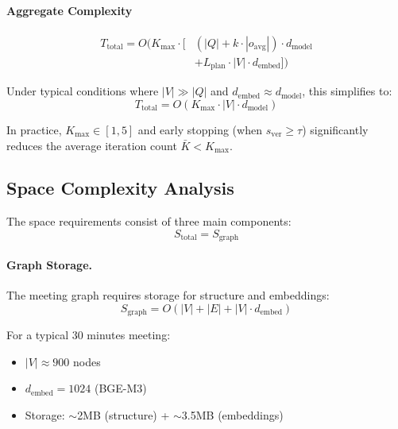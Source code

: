 \documentclass[11pt]{article}
\begin{document}
\paragraph{Aggregate Complexity}


\begin{equation}
\label{eq:time_complexity_final}
\begin{split}
T_{\text{total}} = O\bigg( K_{\max} \cdot \big[ &(|Q| + k \cdot |o_{\text{avg}}|) \cdot d_{\text{model}} \\
&+ L_{\text{plan}} \cdot |V| \cdot d_{\text{embed}} \big] \bigg)
\end{split}
\end{equation}



Under typical conditions where $|V| \gg |Q|$ and $d_{\text{embed}} \approx d_{\text{model}}$, this simplifies to:
\begin{equation}
T_{\text{total}} = O(K_{\max} \cdot |V| \cdot d_{\text{model}})
\end{equation}

In practice, $K_{\max} \in [1, 5]$ and early stopping (when $s_{\text{ver}} \geq \tau$) significantly reduces the average iteration count $\bar{K} < K_{\max}$.

\subsection{Space Complexity Analysis}

The space requirements consist of three main components:
\begin{equation}
S_{\text{total}} = S_{\text{graph}}
\end{equation}

\paragraph{Graph Storage.}
The meeting graph requires storage for structure and embeddings:
\begin{equation}
S_{\text{graph}} = O(|V| + |E| + |V| \cdot d_{\text{embed}})
\end{equation}

For a typical 30 minutes meeting:
\begin{itemize}
    \item $|V| \approx 900$ nodes
    \item $d_{\text{embed}} = 1024$  (BGE-M3)
    \item Storage: $\sim$2MB (structure) + $\sim$3.5MB (embeddings)
\end{itemize}
\end{document}
